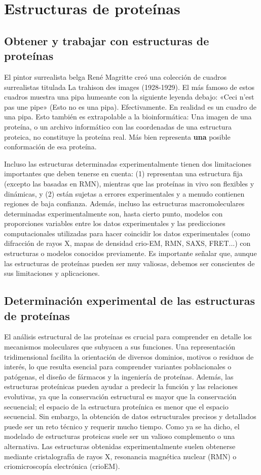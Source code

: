\chapter{Estructuras de proteínas}
\section{Obtener y trabajar con estructuras de proteínas}
El pintor surrealista belga René Magritte creó una colección de cuadros surrealistas titulada La trahison des images (1928-1929). El más famoso de estos cuadros muestra una pipa humeante con la siguiente leyenda debajo: «Ceci n'est pas une pipe» (Esto no es una pipa). Efectivamente. En realidad es un cuadro de una pipa.
Esto también es extrapolable a la bioinformática: Una imagen de una proteína, o un archivo informático con las coordenadas de una estructura proteica, no constituye la proteína real. Más bien representa \textbf{una} posible conformación de esa proteína.

Incluso las estructuras determinadas experimentalmente tienen dos limitaciones importantes que deben tenerse en cuenta: (1) representan una estructura fija (excepto las basadas en RMN), mientras que las proteínas in vivo son flexibles y dinámicas, y (2) están sujetas a errores experimentales y a menudo contienen regiones de baja confianza. Además, incluso las estructuras macromoleculares determinadas experimentalmente son, hasta cierto punto, modelos con proporciones variables entre los datos experimentales y las predicciones computacionales utilizadas para hacer coincidir los datos experimentales (como difracción de rayos X, mapas de densidad crio-EM, RMN, SAXS, FRET...) con estructuras o modelos conocidos previamente. Es importante señalar que, aunque las estructuras de proteínas pueden ser muy valiosas, debemos ser conscientes de sus limitaciones y aplicaciones.

\section{Determinación experimental de las estructuras de proteínas}
El análisis estructural de las proteínas es crucial para comprender en detalle los mecanismos moleculares que subyacen a sus funciones. Una representación tridimensional facilita la orientación de diversos dominios, motivos o residuos de interés, lo que resulta esencial para comprender variantes poblacionales o patógenas, el diseño de fármacos y la ingeniería de proteínas. Además, las estructuras proteínicas pueden ayudar a predecir la función y las relaciones evolutivas, ya que la conservación estructural es mayor que la conservación secuencial; el espacio de la estructura proteínica es menor que el espacio secuencial. Sin embargo, la obtención de datos estructurales precisos y detallados puede ser un reto técnico y requerir mucho tiempo. Como ya se ha dicho, el modelado de estructuras proteicas suele ser un valioso complemento o una alternativa. Las estructuras obtenidas experimentalmente suelen obtenerse mediante cristalografía de rayos X, resonancia magnética nuclear (RMN) o criomicroscopía electrónica (crioEM).

